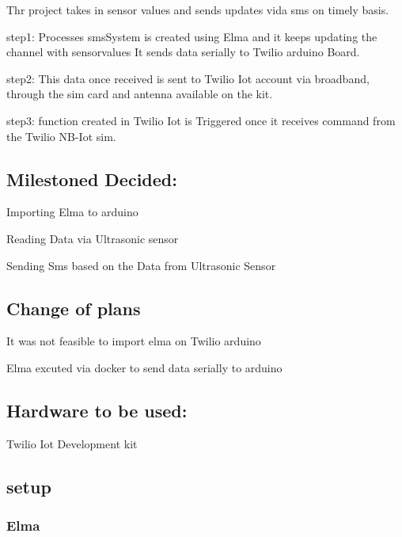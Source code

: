 Thr project takes in sensor values and sends updates vida sms on timely basis.

step1\+: Processes sms\+System is created using Elma and it keeps updating the channel with sensorvalues It sends data serially to Twilio arduino Board.

step2\+: This data once received is sent to Twilio Iot account via broadband, through the sim card and antenna available on the kit.

step3\+: function created in Twilio Iot is Triggered once it receives command from the Twilio N\+B-\/\+Iot sim.

\subsection*{Milestoned Decided\+:}


\begin{DoxyItemize}
\item Importing Elma to arduino
\item Reading Data via Ultrasonic sensor
\item Sending Sms based on the Data from Ultrasonic Sensor
\end{DoxyItemize}

\subsection*{Change of plans}


\begin{DoxyItemize}
\item It was not feasible to import elma on Twilio arduino
\item Elma excuted via docker to send data serially to arduino
\end{DoxyItemize}

\subsection*{Hardware to be used\+:}

Twilio Iot Development kit

\subsection*{setup}

\subsubsection*{Elma}

